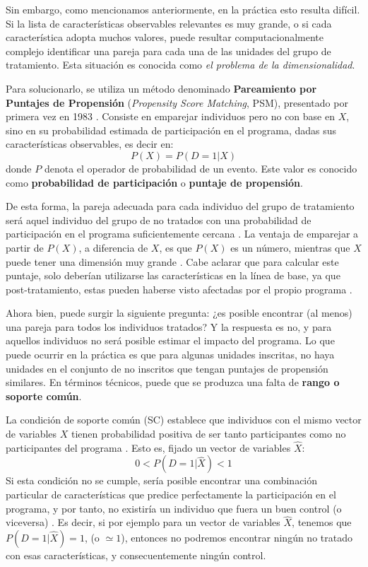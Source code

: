\documentclass[../../main.tex]{subfiles}
\begin{document}
Sin embargo, como mencionamos anteriormente, en la práctica esto resulta difícil. Si la
lista de características observables relevantes es muy grande, o si cada característica
adopta muchos valores, puede resultar computacionalmente complejo identificar una pareja
para cada una de las unidades del grupo de tratamiento. Esta situación es conocida como
\textit{el problema de la dimensionalidad}.

Para solucionarlo, se utiliza un método denominado \textbf{Pareamiento por Puntajes de
Propensión} (\textit{Propensity Score Matching}, PSM), presentado por primera vez en 1983
\cite{psm1983}. Consiste en emparejar individuos pero no con base en \(X\), sino en su
probabilidad estimada de participación en el programa, dadas sus características
observables, es decir en:
\[P(X) = P(D = 1|X)\] donde \(P\) denota el operador de probabilidad de un evento. Este
valor es conocido como \textbf{probabilidad de participación} o \textbf{puntaje de
propensión}.

De esta forma, la pareja adecuada para cada individuo del grupo de tratamiento será aquel
individuo del grupo de no tratados con una probabilidad de participación en el programa
suficientemente cercana \cite{bernal}. La ventaja de emparejar a partir de \(P(X)\), a
diferencia de \(X\), es que \(P(X)\) es un número, mientras que \(X\) puede tener una
dimensión muy grande \cite{bernal}. Cabe aclarar que para calcular este puntaje, solo
deberían utilizarse las características en la línea de base, ya que post-tratamiento,
estas pueden haberse visto afectadas por el propio programa \cite{gertler-2016}.

Ahora bien, puede surgir la siguiente pregunta: ¿es posible encontrar (al menos) una pareja
para todos los individuos tratados? Y la respuesta es no, y para aquellos individuos no
será posible estimar el impacto del programa. Lo que puede ocurrir en la práctica es que
para algunas unidades inscritas, no haya unidades en el conjunto de no inscritos que
tengan puntajes de propensión similares. En términos técnicos, puede que se produzca una
falta de \textbf{rango o soporte común}.

La condición de soporte común (SC) establece que individuos con el mismo vector de
variables \(X\) tienen probabilidad positiva de ser tanto participantes como no
participantes del programa \cite{bernal}. Esto es, fijado un vector de variables
\(\hat{X}\):
\[0 < P(D=1|\hat{X}) < 1\] Si esta condición no se cumple, sería posible encontrar una
combinación particular de características que predice perfectamente la participación en el
programa, y por tanto, no existiría un individuo que fuera un buen control (o viceversa)
\cite{bernal}. Es decir, si por ejemplo para un vector de variables \(\hat{X}\), tenemos
que \(P(D=1|\hat{X})=1\), (o \(\simeq 1\)), entonces no podremos encontrar ningún no
tratado con esas características, y consecuentemente ningún control.
\end{document}
